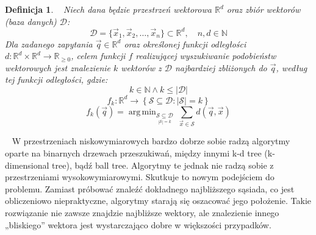 \documentclass[twocolumn]{article}
\DeclareMathOperator*{\argmin}{arg\,min}
\newtheorem{definition}{Definicja}[section]
\begin{document}
\begin{definition}\label{def:vector} \ \newline
Niech dana będzie przestrzeń wektorowa $\mathbb{R}^d$ oraz zbiór wektorów (baza danych) $\mathcal{D}$:
\[
\mathcal{D} = \{ \vec{x}_1, \vec{x}_2, \dots, \vec{x}_n \} \subset \mathbb{R}^d, \quad n,d \in \mathbb{N} 
\]
Dla zadanego zapytania $\vec{q} \in \mathbb{R}^d$ oraz określonej funkcji odległości $d : \mathbb{R}^d \times \mathbb{R}^d \to \mathbb{R}_{\geq 0}$, celem funkcji $f$ realizującej wyszukiwanie podobieństw wektorowych jest znalezienie $k$ wektorów z $\mathcal{D}$ najbardziej zbliżonych do $\vec{q}$, według tej funkcji odległości, gdzie:
\[
k \in \mathbb{N} \land k \leq \left|\mathcal{D}\right|
\]
\[
f_k: \mathbb{R}^d \to \left\{\mathcal{S} \subseteq \mathcal{D} : \left|\mathcal{S}\right| = k\right\}
\]
\[
f_k(\vec{q}) = \argmin_{\underset{\left|\mathcal{S}\right| = k}{\mathcal{S} \subseteq \mathcal{D}}} \ 
\sum_{\vec{x} \in \mathcal{S}} d\left(\vec{q}, \vec{x}\right)
\]
\end{definition} \ \newline
W przestrzeniach niskowymiarowych bardzo dobrze sobie radzą algorytmy oparte na binarnych drzewach przeszukiwań, między innymi k-d tree (k-dimensional tree), bądź ball tree. Algorytmy te jednak nie radzą sobie z przestrzeniami wysokowymiarowymi. Skutkuje to nowym podejściem do problemu. Zamiast próbować znaleźć dokładnego najbliższego sąsiada, co jest obliczeniowo niepraktyczne, algorytmy starają się oszacować jego położenie. Takie rozwiązanie nie zawsze znajdzie najbliższe wektory, ale znalezienie innego „bliskiego” wektora jest wystarczająco dobre w większości przypadków.
\end{document}
